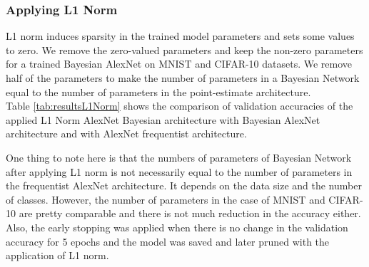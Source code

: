 \subsubsection{Applying L1 Norm}


L1 norm induces sparsity in the trained model parameters and sets some values to zero. We remove the zero-valued parameters and keep the non-zero parameters for a trained Bayesian AlexNet on MNIST and CIFAR-10 datasets. We remove half of the parameters to make the number of parameters in a Bayesian Network equal to the number of parameters in the point-estimate architecture. \\ Table \ref{tab:resultsL1Norm} shows the comparison of validation accuracies of the applied L1 Norm AlexNet Bayesian architecture with Bayesian AlexNet architecture and with AlexNet frequentist architecture. 

\begin{table}[H]
\tiny
    \centering
    \renewcommand{\arraystretch}{1.5}
    \renewcommand{\arraystretch}{1.5}
    \caption{Comparison of validation accuracies (in percentage) for AlexNet with variational inference (VI), AlexNet with frequentist inference and BayesianAlexNet with L1 norm applied for MNIST and CIFAR-10 datasets.}
    \label{tab:resultsL1Norm}
\end{table}

One thing to note here is that the numbers of parameters of Bayesian Network after applying L1 norm is not necessarily equal to the number of parameters in the frequentist AlexNet architecture. It depends on the data size and the number of classes. However, the number of parameters in the case of MNIST and CIFAR-10 are pretty comparable and there is not much reduction in the accuracy either. Also, the early stopping was applied when there is no change in the validation accuracy for 5 epochs and the model was saved and later pruned with the application of L1 norm.

